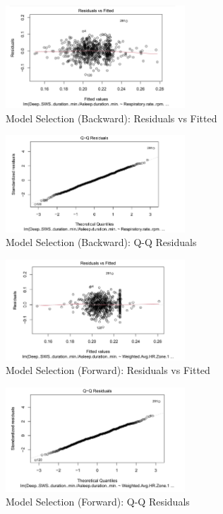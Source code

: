 \documentclass{article}
\begin{document}
\begin{figure}[h!]
  \centering
  \includegraphics[width=0.6\textwidth]{images/selection_backward_plot1.png}
  \caption{Model Selection (Backward): Residuals vs Fitted}
  \label{fig:backward_residuals_vs_fitted}
\end{figure}

\begin{figure}[h!]
  \centering
  \includegraphics[width=0.6\textwidth]{images/selection_backward_plot2.png}
  \caption{Model Selection (Backward): Q-Q Residuals}
  \label{fig:backward_qq_residuals}
\end{figure}

\begin{figure}[h!]
  \centering
  \includegraphics[width=0.6\textwidth]{images/selection_forward_plot1.png}
  \caption{Model Selection (Forward): Residuals vs Fitted}
  \label{fig:forward_residuals_vs_fitted}
\end{figure}

\begin{figure}[h!]
  \centering
  \includegraphics[width=0.6\textwidth]{images/selection_forward_plot2.png}
  \caption{Model Selection (Forward): Q-Q Residuals}
  \label{fig:forward_qq_residuals}
\end{figure}
\end{document}
